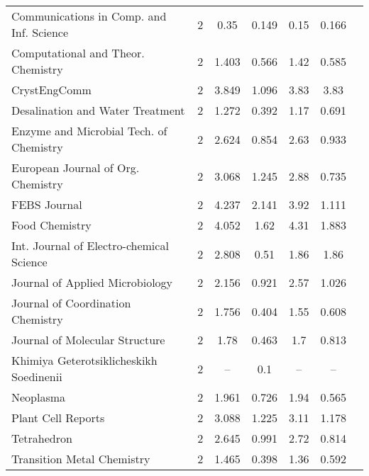 {\begin{longtable}[c]{lcccccc}
 Communications in Comp. and Inf. Science                                           & 2      & 0.35    & 0.149 &  0.15      & 0.166                 \\
 Computational and Theor. Chemistry                                                 & 2      & 1.403   & 0.566 &  1.42      & 0.585                 \\
 CrystEngComm                                                                       & 2      & 3.849   & 1.096 &  3.83      & 3.83                  \\[1ex]
 Desalination and Water Treatment                                                   & 2      & 1.272   & 0.392 &  1.17      & 0.691                 \\
 Enzyme and Microbial Tech. of Chemistry                                            & 2      & 2.624   & 0.854 &  2.63      & 0.933                 \\
 European Journal of Org. Chemistry                                                 & 2      & 3.068   & 1.245 &  2.88      & 0.735                 \\
 FEBS Journal                                                                       & 2      & 4.237   & 2.141 &  3.92      & 1.111                 \\
 Food Chemistry                                                                     & 2      & 4.052   & 1.62  &  4.31      & 1.883                 \\[1ex]
 Int. Journal of Electro-chemical Science                                           & 2      & 2.808   & 0.51  &  1.86      & 1.86                  \\
 Journal of Applied Microbiology                                                    & 2      & 2.156   & 0.921 &  2.57      & 1.026                 \\
 Journal of Coordination Chemistry                                                  & 2      & 1.756   & 0.404 &  1.55      & 0.608                 \\
 Journal of Molecular Structure                                                     & 2      & 1.78    & 0.463 &  1.7       & 0.813                 \\[1ex]
 Khimiya Geterotsiklicheskikh Soedinenii                                            & 2      & --      & 0.1   &  --        & --                      \\
 Neoplasma                                                                          & 2      & 1.961   & 0.726 &  1.94      & 0.565                 \\
 Plant Cell Reports                                                                 & 2      & 3.088   & 1.225 &  3.11      & 1.178                 \\
 Tetrahedron                                                                        & 2      & 2.645   & 0.991 &  2.72      & 0.814                 \\
 Transition Metal Chemistry                                                         & 2      & 1.465   & 0.398 &  1.36      & 0.592                 \\[0.5ex]
\end{longtable}}


